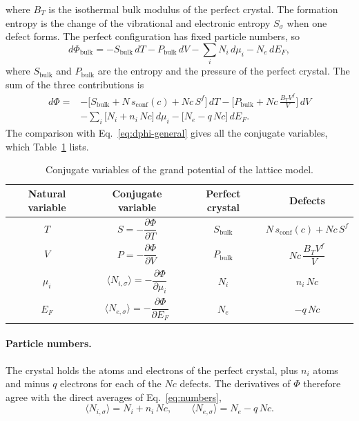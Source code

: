 \documentclass[11pt]{article}      %
\numberwithin{equation}{section}   %
\begin{document}
where $B_T$ is the isothermal bulk modulus of the perfect crystal. The
formation entropy is the change of the vibrational and electronic entropy
$S_\sigma$ when one defect forms. The perfect configuration has fixed
particle numbers, so
\begin{equation*}
    d\Phi_{\text{bulk}}=-S_{\text{bulk}}\,dT-P_{\text{bulk}}\,dV
    -\sum_iN_i\,d\mu_i-N_e\,dE_F,
\end{equation*}
where $S_{\text{bulk}}$ and $P_{\text{bulk}}$ are the entropy and the
pressure of the perfect crystal. The sum of the three contributions is
\begin{equation}
    \boxed{
    \begin{aligned}
    d\Phi={}&-\big[S_{\text{bulk}}+N\,s_{\text{conf}}(c)+Nc\,S^f\big]\,dT
    -\Big[P_{\text{bulk}}+Nc\,\frac{B_TV^f}{V}\Big]\,dV\\
    &-\sum_i\big[N_i+n_i\,Nc\big]\,d\mu_i
    -\big[N_e-q\,Nc\big]\,dE_F.
    \end{aligned}}
    \label{eq:dphi}
\end{equation}
The comparison with Eq.~\eqref{eq:dphi-general} gives all the conjugate
variables, which Table~\ref{tab:conjugates} lists.

\begin{table}[H]
\centering
\caption{Conjugate variables of the grand potential of the lattice model.}
\label{tab:conjugates}
\renewcommand{\arraystretch}{1.9}
\begin{tabular}{|c|c|c|c|}
\hline
Natural variable & Conjugate variable & Perfect crystal & Defects \\ \hline
$T$ & $S=-\dfrac{\partial\Phi}{\partial T}$ & $S_{\text{bulk}}$
    & $N\,s_{\text{conf}}(c)+Nc\,S^f$ \\ \hline
$V$ & $P=-\dfrac{\partial\Phi}{\partial V}$ & $P_{\text{bulk}}$
    & $Nc\,\dfrac{B_TV^f}{V}$ \\ \hline
$\mu_i$ & $\langle N_{i,\sigma}\rangle=-\dfrac{\partial\Phi}{\partial\mu_i}$
    & $N_i$ & $n_i\,Nc$ \\ \hline
$E_F$ & $\langle N_{e,\sigma}\rangle=-\dfrac{\partial\Phi}{\partial E_F}$
    & $N_e$ & $-q\,Nc$ \\ \hline
\end{tabular}
\end{table}

\paragraph{Particle numbers.}
The crystal holds the atoms and electrons of the perfect crystal, plus
$n_i$ atoms and minus $q$ electrons for each of the $Nc$ defects. The
derivatives of $\Phi$ therefore agree with the direct averages of
Eq.~\eqref{eq:numbers},
\begin{equation}
    \boxed{\langle N_{i,\sigma}\rangle=N_i+n_i\,Nc,
    \qquad
    \langle N_{e,\sigma}\rangle=N_e-q\,Nc.}
\end{equation}
\end{document}
